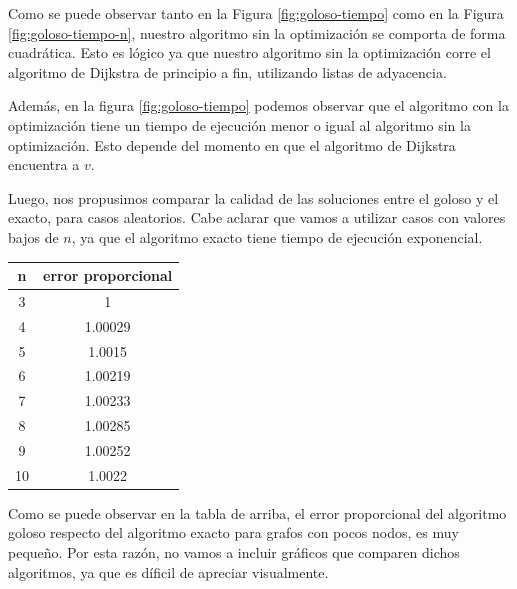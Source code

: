 Como se puede observar tanto en la Figura \ref{fig:goloso-tiempo} como en la Figura \ref{fig:goloso-tiempo-n}, nuestro algoritmo sin la optimización se comporta de forma cuadrática. Esto es lógico ya que nuestro algoritmo sin la optimización corre el algoritmo de Dijkstra de principio a fin, utilizando listas de adyacencia.

Además, en la figura \ref{fig:goloso-tiempo} podemos observar que el algoritmo con la optimización tiene un tiempo de ejecución menor o igual al algoritmo sin la optimización. Esto depende del momento en que el algoritmo de Dijkstra encuentra a $v$.

Luego, nos propusimos comparar la calidad de las soluciones entre el goloso y el exacto, para casos aleatorios. Cabe aclarar que vamos a utilizar casos con valores bajos de $n$, ya que el algoritmo exacto tiene tiempo de ejecución exponencial.

\begin{center}
 \begin{tabular}{|c|c|}
      \hline
      n&error proporcional \\
      \hline
      3&1\\
      4&1.00029\\
      5&1.0015\\
      6&1.00219\\
      7&1.00233\\
      8&1.00285\\
      9&1.00252\\
      10&1.0022\\
      \hline
    \end{tabular}
\end{center}

Como se puede observar en la tabla de arriba, el error proporcional del algoritmo goloso respecto del algoritmo exacto para grafos con pocos nodos, es muy pequeño. Por esta razón, no vamos a incluir gráficos que comparen dichos algoritmos, ya que es díficil de apreciar visualmente.



